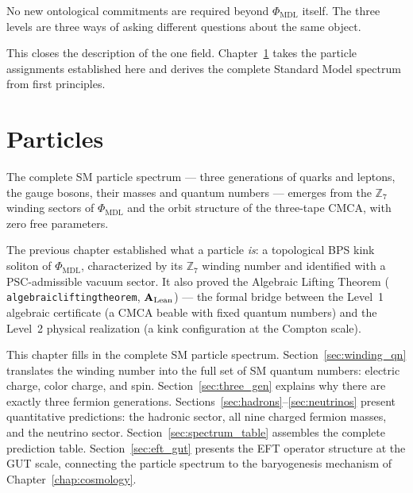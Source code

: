 \documentclass[11pt,openany]{book}
\theoremstyle{remark}
\newcommand{\PHIMDL}{\Phi_{\mathrm{MDL}}}
\newcommand{\ZS}{\mathbb{Z}_7}
\newcommand{\lean}[1]{%
  \penalty-100
  \begingroup\def\_{\textunderscore\allowbreak}\texttt{#1}\endgroup}
\newcommand{\CatAL}{\ensuremath{\textbf{A}_{\rm Lean}}}
\begin{document}
\noindent
No new ontological commitments are required beyond $\PHIMDL$ itself.
The three levels are three ways of asking different questions about the same object.

This closes the description of the one field.
Chapter~\ref{chap:particles} takes the particle assignments established here and derives
the complete Standard Model spectrum from first principles.

\chapter{Particles}
\label{chap:particles}
\label{sec:sm}

\begin{tcolorbox}[colback=blue!5,colframe=blue!50!black,title={Chapter~6 Claim}]
The complete SM particle spectrum --- three generations of quarks and leptons, the
gauge bosons, their masses and quantum numbers --- emerges from the $\mathbb{Z}_7$
winding sectors of $\PHIMDL$ and the orbit structure of the three-tape CMCA,
with zero free parameters.
\end{tcolorbox}

The previous chapter established what a particle \emph{is}: a topological BPS kink soliton
of $\PHIMDL$, characterized by its $\ZS$ winding number and identified with a
PSC-admissible vacuum sector. It also proved the Algebraic Lifting
Theorem (\lean{algebraic\_lifting\_theorem}, \CatAL) --- the formal bridge between
the Level~1 algebraic certificate (a CMCA beable with fixed quantum numbers) and
the Level~2 physical realization (a kink configuration at the Compton scale).

This chapter fills in the complete SM particle spectrum. Section~\ref{sec:winding_qn}
translates the winding number into the full set of SM quantum numbers: electric charge,
color charge, and spin. Section~\ref{sec:three_gen} explains why there are exactly
three fermion generations. Sections~\ref{sec:hadrons}--\ref{sec:neutrinos} present
quantitative predictions: the hadronic sector, all nine charged fermion masses, and
the neutrino sector. Section~\ref{sec:spectrum_table} assembles the complete prediction
table. Section~\ref{sec:eft_gut} presents the EFT operator structure at the GUT scale,
connecting the particle spectrum to the baryogenesis mechanism of
Chapter~\ref{chap:cosmology}.
\end{document}
